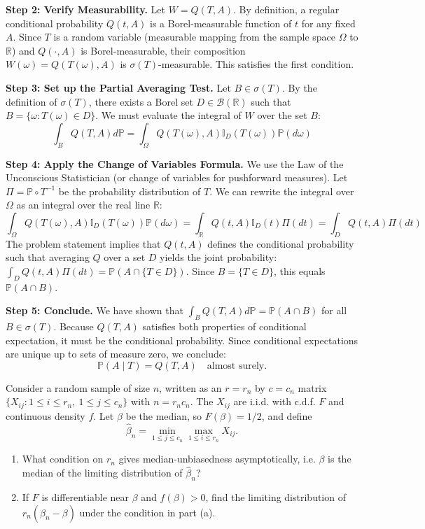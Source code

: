 \begin{solution}
\textbf{Step 2: Verify Measurability.}
Let $W = Q(T, A)$.
By definition, a regular conditional probability $Q(t, A)$ is a Borel-measurable function of $t$ for any fixed $A$.
Since $T$ is a random variable (measurable mapping from the sample space $\Omega$ to $\mathbb{R}$) and $Q(\cdot, A)$ is Borel-measurable, their composition $W(\omega) = Q(T(\omega), A)$ is $\sigma(T)$-measurable.
This satisfies the first condition.

\textbf{Step 3: Set up the Partial Averaging Test.}
Let $B \in \sigma(T)$. By the definition of $\sigma(T)$, there exists a Borel set $D \in \mathcal{B}(\mathbb{R})$ such that $B = \{ \omega : T(\omega) \in D \}$.
We must evaluate the integral of $W$ over the set $B$:
\[ \int_B Q(T, A) d\mathbb{P} = \int_\Omega Q(T(\omega), A) \mathbb{I}_D(T(\omega)) \mathbb{P}(d\omega) \]

\textbf{Step 4: Apply the Change of Variables Formula.}
We use the Law of the Unconscious Statistician (or change of variables for pushforward measures). Let $\Pi = \mathbb{P} \circ T^{-1}$ be the probability distribution of $T$.
We can rewrite the integral over $\Omega$ as an integral over the real line $\mathbb{R}$:
\[ \int_\Omega Q(T(\omega), A) \mathbb{I}_D(T(\omega)) \mathbb{P}(d\omega) = \int_{\mathbb{R}} Q(t, A) \mathbb{I}_D(t) \Pi(dt) = \int_D Q(t, A) \Pi(dt) \]
The problem statement implies that $Q(t, A)$ defines the conditional probability such that averaging $Q$ over a set $D$ yields the joint probability: $\int_D Q(t,A) \Pi(dt) = \mathbb{P}(A \cap \{T \in D\})$.
Since $B = \{T \in D\}$, this equals $\mathbb{P}(A \cap B)$.

\textbf{Step 5: Conclude.}
We have shown that $\int_B Q(T, A) d\mathbb{P} = \mathbb{P}(A \cap B)$ for all $B \in \sigma(T)$.
Because $Q(T, A)$ satisfies both properties of conditional expectation, it must be the conditional probability. Since conditional expectations are unique up to sets of measure zero, we conclude:
\[ \mathbb{P}(A \mid T) = Q(T, A) \quad \text{almost surely.} \]
\end{solution}

\begin{exercise}\label{probability:2024:5}
Consider a random sample of size $n$, written as an $r=r_n$ by $c=c_n$ matrix $\{X_{ij}:1\leq i\leq r_n,\ 1\leq j\leq c_n\}$ with $n=r_nc_n$. The $X_{ij}$ are i.i.d. with c.d.f. $F$ and continuous density $f$. Let $\beta$ be the median, so $F(\beta)=1/2$, and define
\[
\widehat{\beta}_n=\min_{1\leq j\leq c_n}\max_{1\leq i\leq r_n}X_{ij}.
\]
\begin{enumerate}
    \item[(a)] What condition on $r_n$ gives median-unbiasedness asymptotically, i.e. $\beta$ is the median of the limiting distribution of $\widehat{\beta}_n$?
    \item[(b)] If $F$ is differentiable near $\beta$ and $f(\beta)>0$, find the limiting distribution of $r_n(\widehat{\beta}_n-\beta)$ under the condition in part (a).
\end{enumerate}
\end{exercise}

